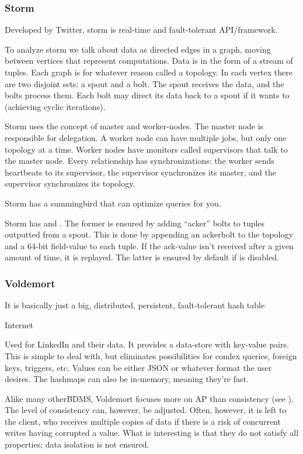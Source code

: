 \subsubsection{Storm}\label{sec:storm}
Developed by Twitter, storm is real-time and fault-tolerant API/framework.

To analyze storm we talk about data as directed edges in a graph, moving between vertices
that represent computations. Data is in the form of a stream of tuples.
Each graph is for whatever reason called a topology. In each vertex there are
two disjoint sets: a spout and a bolt. The spout receives the data, and the bolts
process them. Each bolt may direct its data back to a spout if it wants to (achieving cyclic iterations).

Storm uses the concept of master and worker-nodes. The master node is responsible for delegation.
A worker node can have multiple jobs, but only one topology at a time. Worker nodes have 
monitors called supervisors that talk to the master node.
Every relationship has synchronizations: the worker sends heartbeats to its supervisor, the supervisor
synchronizes its master,  and the supervisor synchronizes its topology.

Storm has a summingbird that can optimize queries for you.

Storm has  and . The former is ensured
by adding ``acker'' bolts to tuples outputted from a spout. This is done by appending
an ackerbolt to the topology and a 64-bit field-value to each tuple. If the ack-value
isn't received after a given amount of time, it is replayed. The latter is
ensured by default if  is disabled.




\subsubsection{Voldemort}\label{sec:voldemort}
\epigraph{It is basically just a big, distributed, persistent, fault-tolerant hash table}{Internet}

Used for LinkedIn and their data. It provides a data-store with key-value
pairs. This is simple to deal with, but eliminates possibilities for comlex
queries, foreign keys, triggers, etc.  Values can be either JSON or whatever format the user desires.
The hashmaps can also be in-memory, meaning they're fast.

Alike many otherBDMS, Voldemort focuses more on AP than
consistency (see ). The level of consistency can,
however, be adjusted. Often, however, it is left to the client, who receives multiple
copies of data if there is a risk of concurrent writes having corrupted a value.
What is interesting is that they do not satisfy all
 properties; data isolation is not ensured. 

